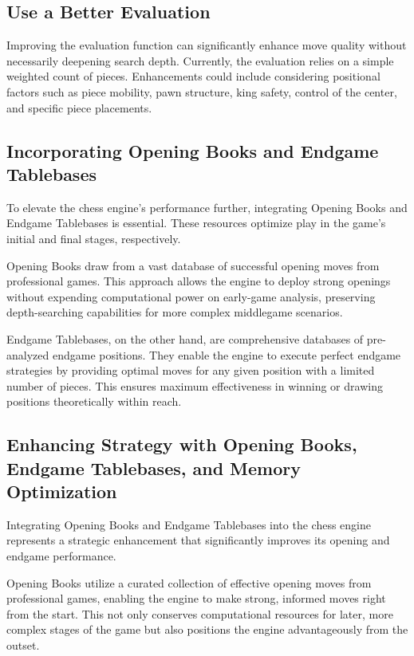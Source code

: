 \documentclass{article}
\begin{document}
\subsection{Use a Better Evaluation}
Improving the evaluation function can significantly enhance move quality without necessarily deepening search depth. Currently, the evaluation relies on a simple weighted count of pieces. Enhancements could include considering positional factors such as piece mobility, pawn structure, king safety, control of the center, and specific piece placements.


\subsection{Incorporating Opening Books and Endgame Tablebases}

To elevate the chess engine's performance further, integrating Opening Books and Endgame Tablebases is essential. These resources optimize play in the game's initial and final stages, respectively.

Opening Books draw from a vast database of successful opening moves from professional games. This approach allows the engine to deploy strong openings without expending computational power on early-game analysis, preserving depth-searching capabilities for more complex middlegame scenarios.

Endgame Tablebases, on the other hand, are comprehensive databases of pre-analyzed endgame positions. They enable the engine to execute perfect endgame strategies by providing optimal moves for any given position with a limited number of pieces. This ensures maximum effectiveness in winning or drawing positions theoretically within reach.

\subsection{Enhancing Strategy with Opening Books, Endgame Tablebases, and Memory Optimization}

Integrating Opening Books and Endgame Tablebases into the chess engine represents a strategic enhancement that significantly improves its opening and endgame performance.

Opening Books utilize a curated collection of effective opening moves from professional games, enabling the engine to make strong, informed moves right from the start. This not only conserves computational resources for later, more complex stages of the game but also positions the engine advantageously from the outset.
\end{document}
